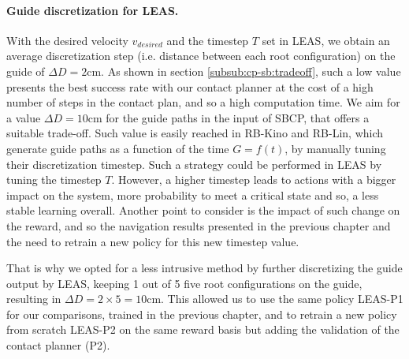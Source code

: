 \paragraph{Guide discretization for LEAS.\label{par:cpsb:discussion_guide_discretization}}
With the desired velocity $v_{desired}$ and the timestep $T$ set in LEAS, we obtain an average discretization step (i.e. distance between each root configuration) on the guide of $\Delta D=2$cm. 
As shown in section \ref{subsub:cp-sb:tradeoff}, such a low value presents the best success rate with our contact planner at the cost of a high number of steps in the contact plan, and so a high computation time. We aim for a value $\Delta D=10$cm for the guide paths in the input of SBCP, that offers a suitable trade-off.
Such value is easily reached in RB-Kino and RB-Lin, which generate guide paths as a function of the time $G=f(t)$, by manually tuning their discretization timestep.
Such a strategy could be performed in LEAS by tuning the timestep $T$.
However, a higher timestep leads to actions with a bigger impact on the system, more probability to meet a critical state and so, a less stable learning overall.
Another point to consider is the impact of such change on the reward, and so the navigation results presented in the previous chapter and the need to retrain a new policy for this new timestep value.

That is why we opted for a less intrusive method by further discretizing the guide output by LEAS, keeping 1 out of 5 five root configurations on the guide, resulting in $\Delta D=2 \times 5=10$cm.
This allowed us to use the same policy LEAS-P1 for our comparisons, trained in the previous chapter, and to retrain a new policy from scratch LEAS-P2 on the same reward basis but adding the validation of the contact planner (P2).

